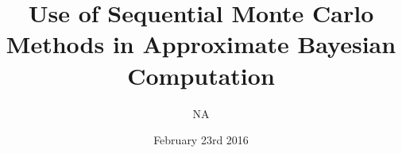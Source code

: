 \titlepage
\title{Use of Sequential Monte Carlo Methods in Approximate Bayesian Computation}
\author{NA}
\date{February 23rd 2016}
\maketitle


